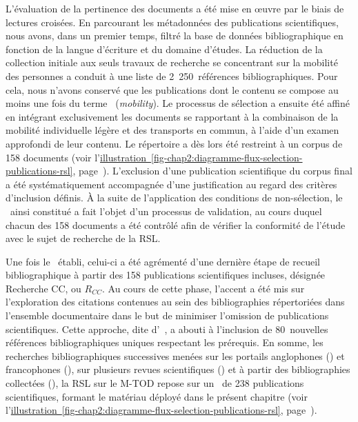\begin{refsegment}
L'évaluation de la pertinence des documents a été mise en œuvre par le biais de lectures croisées. En parcourant les métadonnées des publications scientifiques, nous avons, dans un premier temps, filtré la base de données bibliographique en fonction de la langue d'écriture et du domaine d'études. La réduction de la collection initiale aux seuls travaux de recherche se concentrant sur la mobilité des personnes a conduit à une liste de 2~250~références bibliographiques. Pour cela, nous n'avons conservé que les publications dont le contenu se compose au moins une fois du terme ~(\textsl{mobility}). Le processus de sélection a ensuite été affiné en intégrant exclusivement les documents se rapportant à la combinaison de la mobilité individuelle légère et des transports en commun, à l'aide d'un examen approfondi de leur contenu. Le répertoire a dès lors été restreint à un corpus de 158 documents (voir l'\hyperref[fig-chap2:diagramme-flux-selection-publications-rsl]{illustration~\ref{fig-chap2:diagramme-flux-selection-publications-rsl}}, page~\pageref{fig-chap2:diagramme-flux-selection-publications-rsl}). L'exclusion d'une publication scientifique du corpus final a été systématiquement accompagnée d'une justification au regard des critères d'inclusion définis. À la suite de l'application des conditions de non-sélection, le ~ainsi constitué a fait l'objet d'un processus de validation, au cours duquel chacun des 158 documents a été contrôlé afin de vérifier la conformité de l'étude avec le sujet de recherche de la \acrshort{RSL}.

Une fois le ~établi, celui-ci a été agrémenté d'une dernière étape de recueil bibliographique à partir des 158 publications scientifiques incluses, désignée \acrfull{Recherche CC}, ou \(R_{CC}\). Au cours de cette phase, l'accent a été mis sur l'exploration des citations contenues au sein des bibliographies répertoriées dans l'ensemble documentaire dans le but de minimiser l'omission de publications scientifiques. Cette approche, dite d'~\textcolor{blue}{\autocite[2545]{jain_systematic_2020}}, a abouti à l'inclusion de 80~nouvelles références bibliographiques uniques respectant les prérequis. En somme, les recherches bibliographiques successives menées sur les portails anglophones () et francophones (), sur plusieurs revues scientifiques () et à partir des bibliographies collectées (), la \acrshort{RSL} sur le \acrshort{M-TOD} repose sur un ~de 238 publications scientifiques, formant le matériau déployé dans le présent chapitre (voir l'\hyperref[fig-chap2:diagramme-flux-selection-publications-rsl]{illustration~\ref{fig-chap2:diagramme-flux-selection-publications-rsl}}, page~\pageref{fig-chap2:diagramme-flux-selection-publications-rsl}).


\end{refsegment}
